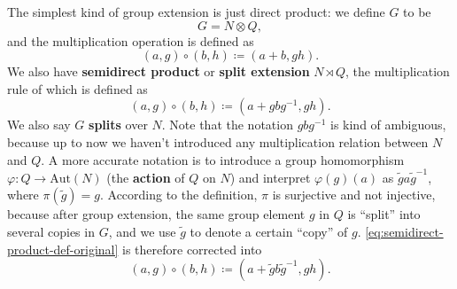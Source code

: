 \documentclass[hyperref, a4paper]{article}
\newcommand*{\concept}[1]{{\textbf{#1}}}
\begin{document}
The simplest kind of group extension is just direct product: we define $G$ to be 
\begin{equation}
    G = N \otimes Q,
\end{equation}
and the multiplication operation is defined as 
\begin{equation}
    (a, g) \circ (b, h) \coloneqq (a + b, g h).
    \label{eq:direct-product-def}
\end{equation}
We also have \concept{semidirect product} or \concept{split extension} $N \rtimes Q$, 
the multiplication rule of which is defined as 
\begin{equation}
    (a, g) \circ (b, h) \coloneqq (a + g b g^{-1}, gh).
    \label{eq:semidirect-product-def-original}
\end{equation}
We also say $G$ \concept{splits} over $N$. Note that the notation $g b g^{-1}$ is kind of ambiguous,
because up to now we haven't introduced any multiplication relation between $N$ and $Q$.
A more accurate notation is to introduce a group homomorphism $\varphi: Q \to \mathrm{Aut}(N)$ (the \concept{action} of $Q$ on $N$)
and interpret $\varphi(g)(a)$ as $\tilde{g} a \tilde{g}^{-1}$, where $\pi(\tilde{g}) = g$. 
According to the definition, $\pi$ is surjective and not injective, because after group extension, 
the same group element $g$ in $Q$ is ``split'' into several copies in $G$, and we use $\tilde{g}$
to denote a certain ``copy'' of $g$. \eqref{eq:semidirect-product-def-original} is therefore corrected into 
\begin{equation}
    (a, g) \circ (b, h) \coloneqq (a + \tilde{g} b \tilde{g}^{-1}, gh).
    \label{eq:semidirect-product-def}
\end{equation}
\end{document}
